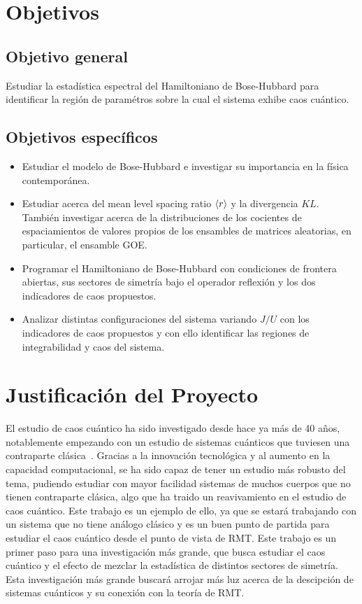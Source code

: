\documentclass[spanish,titlepage,table]{practicas}
\begin{document}
\section{Objetivos}\label{sec:objetivos}
\subsection{Objetivo general}
  Estudiar la estadística espectral del Hamiltoniano de Bose-Hubbard para identificar la región de paramétros sobre la cual 
 el sistema exhibe caos cuántico.
 \subsection{Objetivos específicos}
  \begin{itemize}
    \item Estudiar el modelo de Bose-Hubbard e investigar su importancia en la física contemporánea.
    \item Estudiar acerca del mean level spacing ratio $\ev{r}$ y la divergencia $KL$. También investigar acerca de la distribuciones de los cocientes de espaciamientos de valores propios de los ensambles de matrices aleatorias, en particular, el ensamble GOE.
    \item Programar el Hamiltoniano de Bose-Hubbard con condiciones de frontera abiertas, sus sectores de simetría bajo el operador reflexión y los dos indicadores de caos propuestos.
    \item Analizar distintas configuraciones del sistema variando $J/U$ con los indicadores de caos propuestos y con ello identificar las regiones de integrabilidad y caos del sistema.
 \end{itemize}
 
\section{Justificación del Proyecto}
El estudio de caos cuántico ha sido investigado desde hace ya más de 40 años, notablemente empezando con un estudio de sistemas cuánticos
que tuviesen una contraparte clásica~\cite{Bohigas_1984}. Gracias a la innovación tecnológica y al aumento en la capacidad 
computacional, se ha sido capaz de tener un estudio más robusto del tema,
pudiendo estudiar con mayor facilidad sistemas de muchos cuerpos que no tienen contraparte clásica, algo que ha traido un reavivamiento en el estudio de caos cuántico. Este trabajo es un ejemplo de ello, ya que se estará trabajando con 
un sistema que no tiene análogo clásico y es un buen punto de partida para estudiar el caos cuántico desde el punto de vista de RMT.
Este trabajo es un primer paso para una investigación más grande, que busca estudiar el caos cuántico y el efecto de mezclar la estadística 
de distintos sectores de simetría. Esta investigación más grande buscará arrojar más luz acerca de la descipción de sistemas cuánticos y su conexión con la teoría de RMT.
\end{document}
